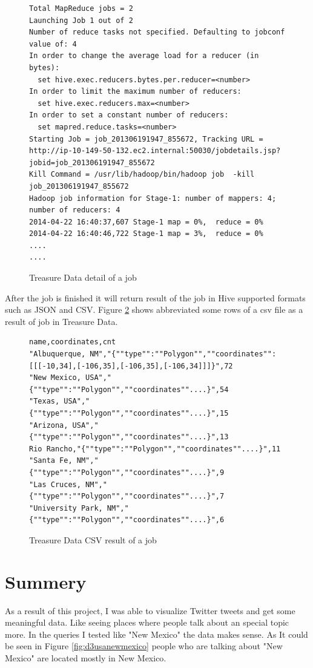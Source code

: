 \documentclass[a4paper,11pt]{report}
\begin{document}
\begin{figure}[!hbp]
\caption{Treasure Data detail of a job}
\begin{lstlisting}
Total MapReduce jobs = 2
Launching Job 1 out of 2
Number of reduce tasks not specified. Defaulting to jobconf value of: 4
In order to change the average load for a reducer (in bytes):
  set hive.exec.reducers.bytes.per.reducer=<number>
In order to limit the maximum number of reducers:
  set hive.exec.reducers.max=<number>
In order to set a constant number of reducers:
  set mapred.reduce.tasks=<number>
Starting Job = job_201306191947_855672, Tracking URL = http://ip-10-149-50-132.ec2.internal:50030/jobdetails.jsp?jobid=job_201306191947_855672
Kill Command = /usr/lib/hadoop/bin/hadoop job  -kill job_201306191947_855672
Hadoop job information for Stage-1: number of mappers: 4; number of reducers: 4
2014-04-22 16:40:37,607 Stage-1 map = 0%,  reduce = 0%
2014-04-22 16:40:46,722 Stage-1 map = 3%,  reduce = 0%
....
....
\end{lstlisting}
\label{fig:tddetail}
\end{figure}

After the job is finished it will return result of the job in Hive supported formats such as JSON and CSV. Figure \ref{fig:tdcsv} shows abbreviated some rows of a csv file as a result of job in Treasure Data.

\begin{figure}[!hbp]
\caption{Treasure Data CSV result of a job}
\begin{lstlisting}
name,coordinates,cnt
"Albuquerque, NM","{""type"":""Polygon"",""coordinates"":[[[-10,34],[-106,35],[-106,35],[-106,34]]]}",72
"New Mexico, USA","{""type"":""Polygon"",""coordinates""....}",54
"Texas, USA","{""type"":""Polygon"",""coordinates""....}",15
"Arizona, USA","{""type"":""Polygon"",""coordinates""....}",13
Rio Rancho,"{""type"":""Polygon"",""coordinates""....}",11
"Santa Fe, NM","{""type"":""Polygon"",""coordinates""....}",9
"Las Cruces, NM","{""type"":""Polygon"",""coordinates""....}",7
"University Park, NM","{""type"":""Polygon"",""coordinates""....}",6
\end{lstlisting}
\label{fig:tdcsv}
\end{figure}

\chapter{Summery}
As a result of this project, I was able to visualize Twitter tweets and get some meaningful data. Like seeing places where people talk about an special topic more. In the queries I tested like "New Mexico" the data makes sense. As It could be seen in Figure \ref{fig:d3usanewmexico} people who are talking about "New Mexico" are located mostly in New Mexico.
\end{document}
